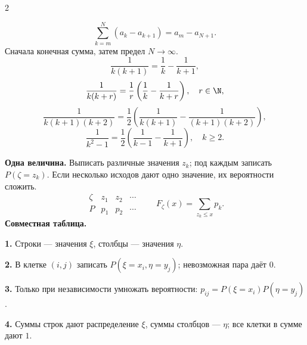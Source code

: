 \documentclass[a4paper,10pt]{article}
\begin{document}
\begin{multicols}{2}
\begin{hint}
\[
\sum_{k=m}^{N}(a_k-a_{k+1})=a_m-a_{N+1}.
\]
Сначала конечная сумма, затем предел $N\to\infty$.
\[
\frac1{k(k+1)}=\frac1k-\frac1{k+1},
\]
\[
\frac1{k(k+r)}=\frac1r\left(\frac1k-\frac1{k+r}\right),\quad r\in\N,
\]
\[
\frac1{k(k+1)(k+2)}
=\frac12\left(\frac1{k(k+1)}-\frac1{(k+1)(k+2)}\right),
\]
\[
\frac1{k^2-1}=\frac12\left(\frac1{k-1}-\frac1{k+1}\right),\quad k\ge2.
\]
\end{hint}

\begin{hint}
\textbf{Одна величина.} Выписать различные значения $z_k$; под каждым записать $P(\zeta=z_k)$. Если несколько исходов дают одно значение, их вероятности сложить.
\[
\begin{array}{c|ccc}
\zeta&z_1&z_2&\cdots\\\hline
P&p_1&p_2&\cdots
\end{array}
\qquad F_\zeta(x)=\sum_{z_k\le x}p_k.
\]
\textbf{Совместная таблица.}
\par\textbf{1.} Строки --- значения $\xi$, столбцы --- значения $\eta$.
\par\textbf{2.} В клетке $(i,j)$ записать $P(\xi=x_i,\eta=y_j)$; невозможная пара даёт $0$.
\par\textbf{3.} Только при независимости умножать вероятности: $p_{ij}=P(\xi=x_i)P(\eta=y_j)$.
\par\textbf{4.} Суммы строк дают распределение $\xi$, суммы столбцов --- $\eta$; все клетки в сумме дают $1$.

\end{hint}
\end{multicols}
\newpage
\end{document}

